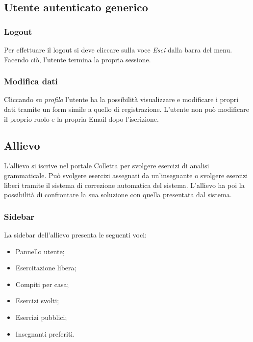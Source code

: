 	
\subsection{Utente autenticato generico}

    \subsubsection{Logout}
    Per effettuare il {logout} si deve cliccare sulla voce \textit{Esci} dalla barra del menu. Facendo ciò, l'utente termina la propria sessione.
    \subsubsection{Modifica dati}
    Cliccando su \textit{profilo} l'utente ha la possibilità visualizzare e modificare i propri dati tramite un form simile a quello di registrazione. L'utente non può modificare il proprio ruolo e la propria Email dopo l'iscrizione.

\newpage
    \subsection{Allievo}
      L'allievo si iscrive nel portale Colletta per svolgere esercizi di analisi grammaticale. Può svolgere esercizi assegnati da un'insegnante o svolgere esercizi liberi tramite il sistema di correzione automatica del sistema. L'allievo ha poi la possibilità di confrontare la sua soluzione con quella presentata dal sistema.
        \subsubsection{Sidebar}
          La sidebar dell'allievo presenta le seguenti voci:
            \begin{itemize}
                \item Pannello utente;
                \item Esercitazione libera;
                \item Compiti per casa;
                \item Esercizi svolti;
                \item Esercizi pubblici;
                \item Insegnanti preferiti.
            \end{itemize}
            

            
